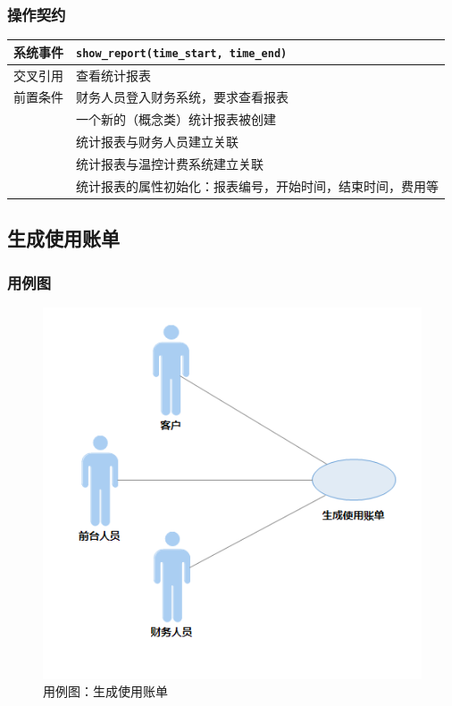 \documentclass[blue,normal,cn]{elegantnote}
\newcommand{\code}[1]{\colorbox{light-gray}{\texttt{#1}}}
\begin{document}
\subsubsection{操作契约}

\begin{center}
    \begin{tabular}{|>{\centering}m{}|m{}|}
        \hline
        系统事件                  & \multicolumn{1}{l|}{\code{show\_report(time\_start, time\_end)}} \\
        \hline
        交叉引用                  & 查看统计报表                                                     \\
        \hline
        前置条件                  & 财务人员登入财务系统，要求查看报表                               \\
        \hline
        \multirow{4}{*}{后置条件} & 一个新的（概念类）统计报表被创建                                 \\
        \cline{2-2}
                                  & 统计报表与财务人员建立关联                                       \\
        \cline{2-2}
                                  & 统计报表与温控计费系统建立关联                                   \\
        \cline{2-2}
                                  & 统计报表的属性初始化：报表编号，开始时间，结束时间，费用等       \\
        \hline
    \end{tabular}
\end{center}

\subsection{生成使用账单}
\subsubsection{用例图}

\begin{figure}[H]
    \centering
    \includegraphics[width=.5\textwidth]{fig/276003.png}
    \caption{用例图：生成使用账单}
    \label{fig:276003}
\end{figure}
\end{document}
